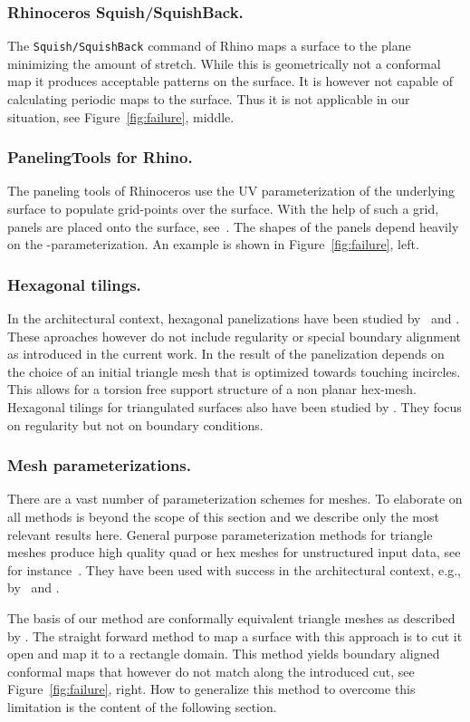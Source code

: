 \documentclass[article.tex]{subfiles}
\begin{document}
\subsubsection{Rhinoceros Squish/SquishBack.}
The {\tt Squish/SquishBack} command of Rhino maps a surface to the
plane minimizing the amount of stretch. While this is geometrically
not a conformal map it produces acceptable patterns on the surface. It
is however not capable of calculating periodic maps to the surface.
Thus it is not applicable in our situation, see
Figure~\ref{fig:failure}, middle.

\subsubsection{PanelingTools for Rhino.}
The paneling tools of Rhinoceros use the UV parameterization of the
underlying surface to populate grid-points over the surface. With the
help of such a grid, panels are placed onto the surface,
see~\cite{panelingtools}. The shapes of the panels depend heavily on
the \nurbs-parameterization. An example is shown in
Figure~\ref{fig:failure}, left.

\subsubsection{Hexagonal tilings.}
In the architectural context, hexagonal panelizations have been
studied by~\cite{TangentPlanes, Troche} and \cite{SHWP09}. These
aproaches however do not include regularity or special boundary
alignment as introduced in the current work.  In \cite{SHWP09} the
result of the panelization depends on the choice of an initial
triangle mesh that is optimized towards touching incircles. This
allows for a torsion free support structure of a non planar
hex-mesh. Hexagonal tilings for triangulated surfaces also have been
studied by \cite{NieserPPZ12}. They focus on regularity but not on
boundary conditions.

\subsubsection{Mesh parameterizations.}
There are a vast number of parameterization schemes for meshes. To
elaborate on all methods is beyond the scope of this section and we
describe only the most relevant results here. General purpose
parameterization methods for triangle meshes produce high quality quad
or hex meshes for unstructured input data, see for
instance~\cite{Bommes2009, ARAP, SSP08}. They have been used with
success in the architectural context, e.g., by~\cite{bo-2011-cas} and
\cite{SRB12}.

The basis of our method are conformally equivalent triangle meshes as
described by \cite{SSP08}. The straight forward method to map a
surface with this approach is to cut it open and map it to a rectangle
domain. This method yields boundary aligned conformal maps that
however do not match along the introduced cut, see
Figure~\ref{fig:failure}, right. How to generalize this method to
overcome this limitation is the content of the following section.

\subfilebibliography
\end{document}
